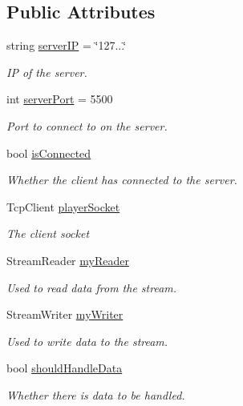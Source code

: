 \subsection*{Public Attributes}
\begin{DoxyCompactItemize}
\item 
string \mbox{\hyperlink{class_network_a7b66965653988950efaf3ec4de0f6cdd}{server\+IP}} = \char`\"{}127...\char`\"{}
\begin{DoxyCompactList}\small\item\em IP of the server. \end{DoxyCompactList}\item 
int \mbox{\hyperlink{class_network_a871eb8ca681b377dc341b4bf4df08367}{server\+Port}} = 5500
\begin{DoxyCompactList}\small\item\em Port to connect to on the server. \end{DoxyCompactList}\item 
bool \mbox{\hyperlink{class_network_a52a8a42e75c5dea2078f8a20a4293607}{is\+Connected}}
\begin{DoxyCompactList}\small\item\em Whether the client has connected to the server. \end{DoxyCompactList}\item 
Tcp\+Client \mbox{\hyperlink{class_network_ab009762179a0fc5916b8bebeb8f0a32f}{player\+Socket}}
\begin{DoxyCompactList}\small\item\em The client socket \end{DoxyCompactList}\item 
Stream\+Reader \mbox{\hyperlink{class_network_ae8836ce514687bd3c43e16aad880d248}{my\+Reader}}
\begin{DoxyCompactList}\small\item\em Used to read data from the stream. \end{DoxyCompactList}\item 
Stream\+Writer \mbox{\hyperlink{class_network_a1fa8240fd7edc4368301ad87f2c1ebf5}{my\+Writer}}
\begin{DoxyCompactList}\small\item\em Used to write data to the stream. \end{DoxyCompactList}\item 
bool \mbox{\hyperlink{class_network_a1df7f2025ab9462bf56814c17d5be87b}{should\+Handle\+Data}}
\begin{DoxyCompactList}\small\item\em Whether there is data to be handled. \end{DoxyCompactList}\end{DoxyCompactItemize}
